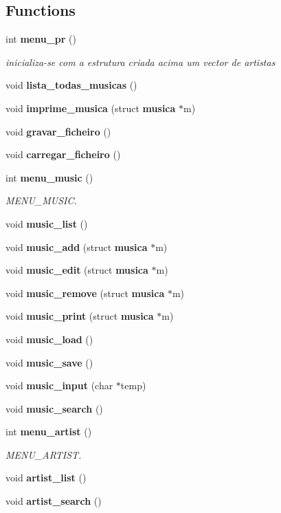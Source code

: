 \subsection*{Functions}
\begin{DoxyCompactItemize}
\item 
int \textbf{ menu\+\_\+pr} ()
\begin{DoxyCompactList}\small\item\em inicializa-\/se com a estrutura criada acima um vector de artistas \end{DoxyCompactList}\item 
void \textbf{ lista\+\_\+todas\+\_\+musicas} ()
\item 
void \textbf{ imprime\+\_\+musica} (struct \textbf{ musica} $\ast$m)
\item 
void \textbf{ gravar\+\_\+ficheiro} ()
\item 
void \textbf{ carregar\+\_\+ficheiro} ()
\item 
int \textbf{ menu\+\_\+music} ()
\begin{DoxyCompactList}\small\item\em M\+E\+N\+U\+\_\+\+M\+U\+S\+IC. \end{DoxyCompactList}\item 
void \textbf{ music\+\_\+list} ()
\item 
void \textbf{ music\+\_\+add} (struct \textbf{ musica} $\ast$m)
\item 
void \textbf{ music\+\_\+edit} (struct \textbf{ musica} $\ast$m)
\item 
void \textbf{ music\+\_\+remove} (struct \textbf{ musica} $\ast$m)
\item 
void \textbf{ music\+\_\+print} (struct \textbf{ musica} $\ast$m)
\item 
void \textbf{ music\+\_\+load} ()
\item 
void \textbf{ music\+\_\+save} ()
\item 
void \textbf{ music\+\_\+input} (char $\ast$temp)
\item 
void \textbf{ music\+\_\+search} ()
\item 
int \textbf{ menu\+\_\+artist} ()
\begin{DoxyCompactList}\small\item\em M\+E\+N\+U\+\_\+\+A\+R\+T\+I\+ST. \end{DoxyCompactList}\item 
void \textbf{ artist\+\_\+list} ()
\item 
void \textbf{ artist\+\_\+search} ()
\item 

\end{DoxyCompactItemize}
